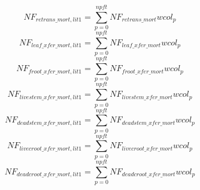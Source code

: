 \begin{equation}
  NF_{retrans\_{mort,lit1}}=\sum_{p=0}^{npft}{NF_{retrans\_{mort}}{wcol_p}}
\end{equation}
\begin{equation}
  NF_{leaf\_{{xfer}\_{mort,lit1}}}=\sum_{p=0}^{npft}{NF_{{leaf}\_{xfer\_{mort}}}{wcol_p}}
\end{equation}
\begin{equation}
  NF_{froot\_{xfer\_{mort,lit1}}}=\sum_{p=0}^{npft}{NF_{froot\_{xfer\_{mort}}}}{wcol_p}
\end{equation}
\begin{equation}
  NF_{livestem\_{xfer\_{mort,lit1}}}=\sum_{p=0}^{npft}{NF_{livestem\_{xfer\_{mort}}}{wcol_p}}
\end{equation}
\begin{equation}
NF_{deadstem\_{xfer\_{mort,lit1}}}=\sum_{p=0}^{npft}{NF_{deadstem\_{xfer\_{mort}}}{wcol_p}}
\end{equation}
\begin{equation}
  NF_{livecroot\_{xfer\_{mort,lit1}}}=\sum_{p=0}^{npft}{NF_{livecroot\_{xfer\_{mort}}}{wcol_p}}
\end{equation}
\begin{equation}
  NF_{deadcroot\_{xfer\_{mort,lit1}}}=\sum_{p=0}^{npft}{NF_{deadcroot\_{xfer\_{mort}}}{wcol_p}}
\end{equation}

